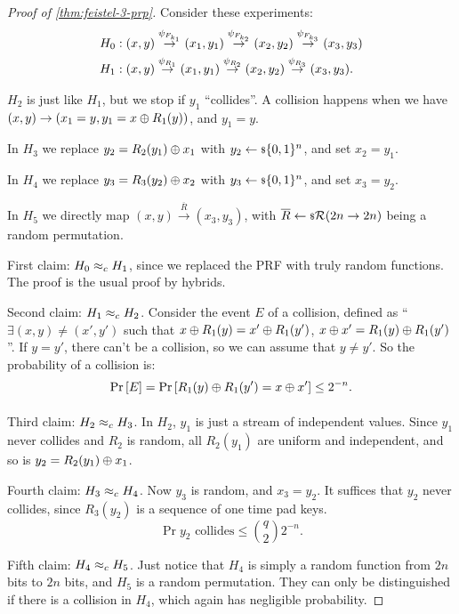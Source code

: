 \begin{proof}[Proof of \cref{thm:feistel-3-prp}]
	Consider these experiments:
	\begin{align*}
		H_0 & : (x,y) \overset{\Feistel[F_{k_1}]}{\to} (x_1, y_1) \overset{\Feistel[F_{k_2}]}{\to} (x_2, y_2) \overset{\Feistel[F_{k_3}]}{\to} (x_3, y_3) \\
		H_1 & : (x,y) \overset{\Feistel[R_1]}{\to} (x_1, y_1) \overset{\Feistel[R_2]}{\to} (x_2, y_2) \overset{\Feistel[R_3]}{\to} (x_3, y_3).
	\end{align*}

	$H_2$ is just like $H_1$, but we stop if $y_1$ ``collides''.
	A collision happens when we have $(x,y) \to (x_1 = y, y_1 = x \xor R_1(y))$, and $y_1 = y$.

	In $H_3$ we replace $y_2 = R_2(y_1) \xor x_1$ with $y_2 \rand{\{0,1\}^{n}}$, and set $x_2 = y_1$.

	In $H_4$ we replace $y_3 = R_3(y_2) \xor x_2$ with $y_3 \rand{\{0,1\}^{n}}$, and set $x_3 = y_2$.

	In $H_5$ we directly map $(x,y) \overset{\overline{R}}{\to} (x_3, y_3)$, with $\overline{R} \rand{\R(2n \to 2n)}$ being a random permutation.

	First claim: $H_0 \CompInd H_1$, since we replaced the \ac{PRF} with truly random functions.
	The proof is the usual proof by hybrids.

	Second claim: $H_1 \CompInd H_2$.
	Consider the event $E$ of a collision, defined as ``$\exists (x,y) \neq (x',y')$ such that $x \xor R_1(y) = x' \xor R_1(y')$, \ie $x \xor x' = R_1(y) \xor R_1(y')$''.
	If $y = y'$, there can't be a collision, so we can assume that $y \neq y'$.
	So the probability of a collision is:
	\begin{equation*}
		\Pr{E} = \Pr{R_1(y) \xor R_1(y') = x \xor x'} \le 2^{-n}.
	\end{equation*}

	Third claim: $H_2 \CompInd H_3$.
	In $H_2$, $y_1$ is just a stream of independent values.
	Since $y_1$ never collides and $R_2$ is random, all $R_2(y_1)$ are uniform and independent, and so is $y_2 = R_2(y_1) \xor x_1$.

	Fourth claim: $H_3 \CompInd H_4$.
	Now $y_3$ is random, and $x_3 = y_2$.
	It suffices that $y_2$ never collides, since $R_3(y_2)$ is a sequence of one time pad keys.
	\begin{equation*}
		\Pr{y_2 \text{ collides}} \le \binom{q}{2} 2^{-n}.
	\end{equation*}

	Fifth claim: $H_4 \CompInd H_5$.
	Just notice that $H_4$ is simply a random function from $2n$ bits to $2n$ bits, and $H_5$ is a random permutation.
	They can only be distinguished if there is a collision in $H_4$, which again has negligible probability.
\end{proof}

